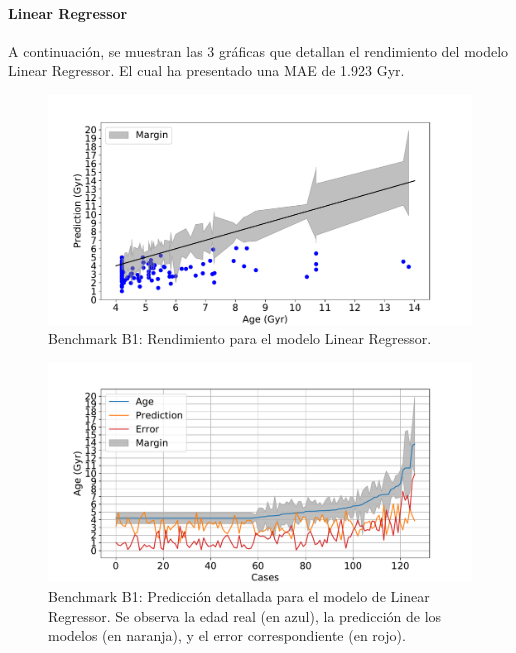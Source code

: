 \paragraph{Linear Regressor} 
A continuación, se muestran las 3 gráficas que detallan el rendimiento del modelo Linear Regressor. El cual ha presentado una MAE de 1.923 Gyr.
\begin{figure}[H]
\begin{center}
 \includegraphics[width=0.8\linewidth]{Figuras/Experimentos/B_B1_lr_1.pdf}
\end{center}
\caption{Benchmark B1: Rendimiento para el modelo Linear Regressor.}
 \label{fig:benchB1_details_lr_1}
\end{figure}

\begin{figure}[H]
\begin{center}
 \includegraphics[width=0.8\linewidth]{Figuras/Experimentos/B_B1_lr_2.pdf}
\end{center}
\caption{Benchmark B1: Predicción detallada para el modelo de Linear Regressor. Se observa la edad real (en azul), la predicción de los modelos (en naranja), y el error correspondiente (en rojo).}
 \label{fig:benchB1_details_lr_2}
\end{figure}

